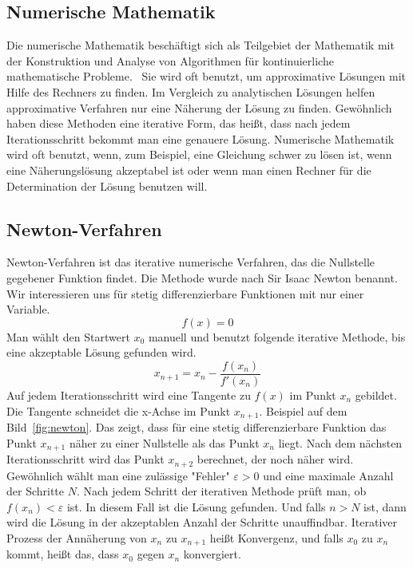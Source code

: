 \documentclass[a4paper,12pt]{llncs}
\numberwithin{equation}{section}
\begin{document}
\subsection{Numerische Mathematik}
Die numerische Mathematik beschäftigt sich als Teilgebiet der Mathematik mit der Konstruktion und Analyse von Algorithmen für kontinuierliche mathematische Probleme.~\cite{nummath}
Sie wird oft benutzt, um approximative Lösungen mit Hilfe des Rechners zu finden.
Im Vergleich zu analytischen Lösungen helfen approximative Verfahren nur eine Näherung der Lösung zu finden.
Gewöhnlich haben diese Methoden eine iterative Form, das heißt, dass nach jedem Iterationsschritt bekommt man eine genauere Lösung.
Numerische Mathematik wird oft benutzt, wenn, zum Beispiel, eine Gleichung schwer zu lösen ist, wenn eine Näherungslösung akzeptabel ist oder wenn man einen Rechner für die Determination der Lösung benutzen will.

\subsection{Newton-Verfahren}
Newton-Verfahren ist das iterative numerische Verfahren, das die Nullstelle gegebener Funktion findet.
Die Methode wurde nach Sir Isaac Newton benannt. \\
Wir interessieren uns für stetig differenzierbare Funktionen mit nur einer Variable.
\[
f(x) = 0
\] 
Man wählt den Startwert $x_0$ manuell und benutzt folgende iterative Methode, bis eine akzeptable Lösung gefunden wird.
\[
x_{n+1} = x_n - \frac{f(x_n)}{f'(x_n)}
\] 
Auf jedem Iterationsschritt wird eine Tangente zu $f(x)$ im Punkt $x_n$ gebildet.
Die Tangente schneidet die x-Achse im Punkt $x_{n+1}$. 
Beispiel auf dem Bild~\ref{fig:newton}.
Das zeigt, dass für eine stetig differenzierbare Funktion das Punkt $x_{n+1}$ näher zu einer Nullstelle als das Punkt $x_n$ liegt.
Nach dem nächsten Iterationsschritt wird das Punkt $x_{n+2}$ berechnet, der noch näher wird.\\
Gewöhnlich wählt man eine zulässige "Fehler" $\varepsilon>0$ und eine maximale Anzahl der Schritte $N$.
Nach jedem Schritt der iterativen Methode prüft man, ob $f(x_n)  < \varepsilon$ ist. 
In diesem Fall ist die Lösung gefunden.
Und falls $n > N$ ist, dann wird die Lösung in der akzeptablen Anzahl der Schritte unauffindbar. 
Iterativer Prozess der Annäherung von $x_n$ zu $x_{n+1}$ heißt Konvergenz, und falls $x_0$ zu $x_n$ kommt, heißt das, dass $x_0$ gegen $x_n$ konvergiert.
\end{document}

